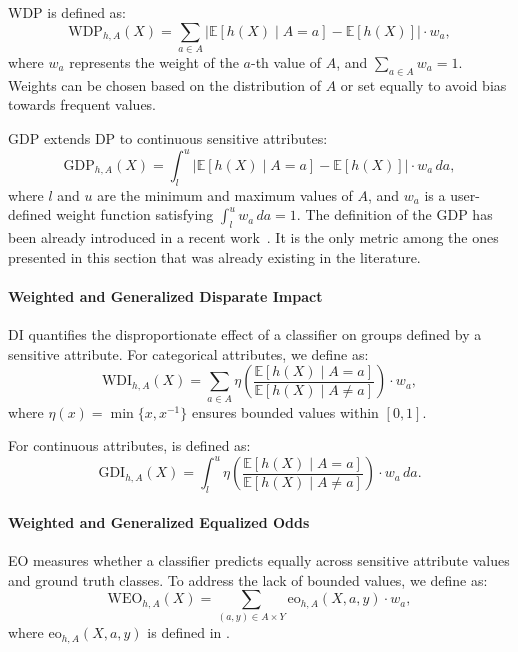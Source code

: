 \Gls{WDP} is defined as:
%
\begin{equation}
    \label{eq:wdp}
    \text{WDP}_{h,A}(X) = \sum_{a \in A} \left| \mathbb{E}[h(X) \mid A = a] - \mathbb{E}[h(X)] \right| \cdot w_a,
\end{equation}
%
where \( w_a \) represents the weight of the \( a \)-th value of \( A \), and \( \sum_{a \in A} w_a = 1 \).
%
Weights can be chosen based on the distribution of \( A \) or set equally to avoid bias towards frequent values.


\Gls{GDP} extends \gls{DP} to continuous sensitive attributes:
%
\begin{equation}
    \label{eq:gdp}
    \text{GDP}_{h,A}(X) = \int_{l}^{u} \left| \mathbb{E}[h(X) \mid A = a] - \mathbb{E}[h(X)] \right| \cdot w_a \, da,
\end{equation}
%
where \( l \) and \( u \) are the minimum and maximum values of \( A \), and \( w_a \) is a user-defined weight function satisfying \( \int_{l}^{u} w_a \, da = 1 \).
%
The definition of the \gls{GDP} has been already introduced in a recent work~\cite{DBLP:conf/iclr/JiangHFYMH22}.
%
It is the only metric among the ones presented in this section that was already existing in the literature.


\paragraph{Weighted and Generalized Disparate Impact}
%
\Gls{DI} quantifies the disproportionate effect of a classifier on groups defined by a sensitive attribute.
%
For categorical attributes, we define  as:
%
\begin{equation}
    \label{eq:wdi}
    \text{WDI}_{h,A}(X) = \sum_{a \in A} \eta \left( \frac{\mathbb{E}[h(X) \mid A = a]}{\mathbb{E}[h(X) \mid A \neq a]} \right) \cdot w_a,
\end{equation}
%
where \( \eta(x) = \min\{x, x^{-1}\} \) ensures bounded values within \([0, 1]\).


For continuous attributes,  is defined as:
%
\begin{equation}
    \label{eq:gdi}
    \text{GDI}_{h,A}(X) = \int_{l}^{u} \eta \left( \frac{\mathbb{E}[h(X) \mid A = a]}{\mathbb{E}[h(X) \mid A \neq a]} \right) \cdot w_a \, da.
\end{equation}


\paragraph{Weighted and Generalized Equalized Odds}
%
\Gls{EO} measures whether a classifier predicts equally across sensitive attribute values and ground truth classes.
%
To address the lack of bounded values, we define  as:
%
\begin{equation}
    \label{eq:weo}
    \text{WEO}_{h,A}(X) = \sum_{(a, y) \in A \times Y} \text{eo}_{h,A}(X, a, y) \cdot w_a,
\end{equation}
%
where \( \text{eo}_{h,A}(X, a, y) \) is defined in .


